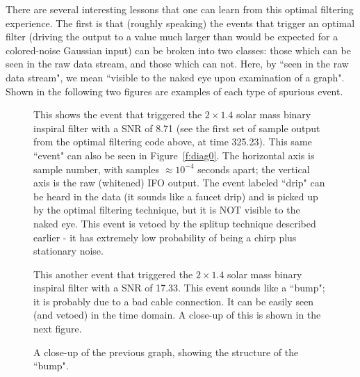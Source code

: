 There are several interesting lessons that one can learn from this
optimal filtering experience.  The first is that (roughly speaking) the
events that trigger an optimal filter (driving the output to a value
much larger than would be expected for a colored-noise Gaussian input)
can be broken into two classes: those which can be seen in the raw data
stream, and those which can not.  Here, by ``seen in the raw data
stream", we mean ``visible to the naked eye upon examination of a
graph".  Shown in the following two figures are examples of each type
of spurious event.

\begin{figure}
\begin{center}
\caption{ \label{f:drip}
This shows the event that triggered the $2\times 1.4$ solar mass binary
inspiral filter with a SNR of 8.71 (see the first set of sample output
from the optimal filtering code above, at time 325.23).  This same
``event" can also be seen in Figure~\ref{f:diag0}.  The horizontal axis
is sample number, with samples $\approx 10^{-4}$ seconds apart; the
vertical axis is the raw (whitened) IFO output.  The event labeled
``drip" can be heard in the data (it sounds like a faucet drip) and is
picked up by the optimal filtering technique, but it is NOT visible to
the naked eye.  This event is vetoed by the splitup technique described
earlier - it has extremely low probability of being a chirp plus
stationary noise.}
\end{center}
\end{figure}

\begin{figure}
\begin{center}
\caption{ \label{f:bump1}
This another event that triggered the $2\times 1.4$ solar mass binary
inspiral filter with a SNR of 17.33.  This event sounds like a ``bump";
it is probably due to a bad cable connection.  It can be easily seen
(and vetoed) in the time domain.  A close-up of this is shown in the next
figure.}
\end{center}
\end{figure}

\begin{figure}
\begin{center}
\caption{ \label{f:bump2}
A close-up of the previous graph, showing the structure of the ``bump".}
\end{center}
\end{figure}

